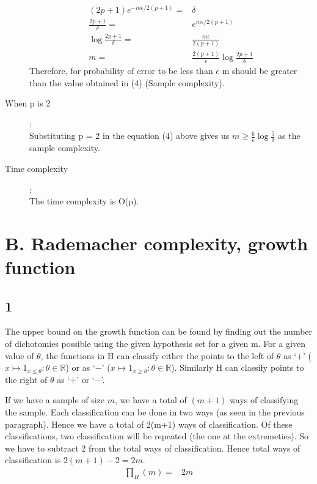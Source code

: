\documentclass{article}
\begin{document}
\begin{description}
    \begin{align}
      (2p+1)e^{-m\epsilon/2(p+1)} = & \delta\\
      \frac{2p+1}{\delta} = & e^{m\epsilon/2(p+1)}\\
      \log{\frac{2p+1}{\delta}} = & \frac{m\epsilon}{2(p+1)}\\
      m = & \frac{2(p+1)}{\epsilon} \log{\frac{2p+1}{\delta}}
    \end{align}
    Therefore, for probability of error to be less than \(\epsilon\) m should be greater than the value obtained in (4) (Sample complexity).
  \item[When p is 2]:\\
    Substituting p = 2 in the equation (4) above gives us \(m \ge \frac{6}{\epsilon} \log{\frac{5}{\delta}}\) as the sample complexity.
  \item[Time complexity]:\\
    The time complexity is O(p).
\end{description}

\newpage
\section*{B. Rademacher complexity, growth function}
\subsection*{1}

The upper bound on the growth function can be found by finding out the number of dichotomies possible using the given hypothesis set for a given m.  For a given value of \( \theta \), the functions in H can classify either the points to the left of \(\theta\) as `\( + \)' (\( x \mapsto 1_{x \le \theta} : \theta \in \mathbb{R} \)) or as `\( - \)' (\( x \mapsto 1_{x \ge \theta} : \theta \in \mathbb{R} \)).  Similarly H can classify points to the right of \( \theta \) as `\( + \)' or `\( - \)'.

If we have a sample of size \(m\), we have a total of \((m+1)\) ways of classifying the sample.  Each classification can be done in two ways (as seen in the previous paragraph).  Hence we have a total of 2(m+1) ways of classification.  Of these classifications, two classification will be repeated (the one at the extremeties).  So we have to subtract 2 from the total ways of classification.  Hence total ways of classification is \(  2(m+1) - 2 = 2m\).
\begin{align*}
  \prod_{H}(m) = & 2m
\end{align*}
\end{document}
